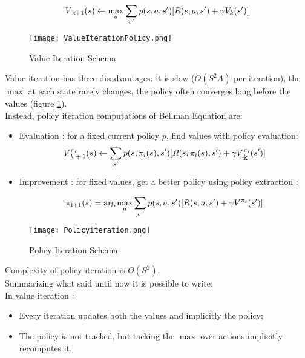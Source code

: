 \begin{equation}
	V\textsubscript{k+1}(s) \leftarrow \max_{a} \sum_{s'} p(s, a, s') [R(s, a, s') + \gamma V_k(s')]
\end{equation}

\begin{figure}[h!]
	\centering
	\texttt{[image: ValueIterationPolicy.png]}
	\caption{Value Iteration Schema}
	\label{fig:ValueiterationPolicy}
\end{figure}

Value iteration has three disadvantages: it is slow ($O(S^2A)$ per iteration), the $\max$ at each state rarely changes, the policy often converges long before the values (figure \ref{fig:ValueiterationPolicy}). \\

Instead, policy iteration computations of Bellman Equation are:

\begin{itemize}
	\item Evaluation : for a fixed current policy $p$, find values with policy evaluation:
		\begin{equation}
			V\textsupsub{$\pi_i$}{$k+1$}(s) \leftarrow \sum_{s'}p(s, \pi_i(s), s')[R(s, \pi_i(s), s') + \gamma V\textsupsub{$\pi_i$}{k}(s')]
		\end{equation}
	
	\item Improvement : for fixed values, get a better policy using policy extraction :
	
	\begin{equation}
		\pi\textsubscript{i+1}(s) = \arg \max_{a} \sum_{s'} p(s, a, s')[R(s, a, s') + \gamma V\textsuperscript{$\pi_i$}(s')]
	\end{equation}
\end{itemize}

\begin{figure}[h!]
	\centering
	\texttt{[image: Policyiteration.png]}
	\caption{Policy Iteration Schema}
	\label{fig:PolicyIteration}
\end{figure}

Complexity of policy iteration is $O(S^2)$. \\

Summarizing what said until now it is possible to write: \\ 

In value iteration :

\begin{itemize}
	\item Every iteration updates both the values and implicitly the policy;
	\item The policy is not tracked, but tacking the $\max$ over actions implicitly recomputes it.
\end{itemize}

